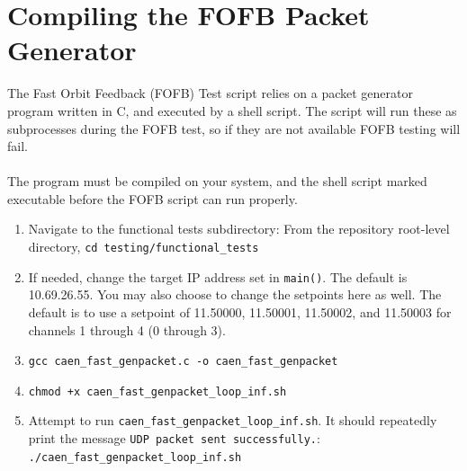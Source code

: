 \section{Compiling the FOFB Packet Generator}
The Fast Orbit Feedback (FOFB) Test script relies on a packet generator program written in C, and executed by a shell script. The script will run these as subprocesses during the FOFB test, so if they are not available FOFB testing will fail.\\\\The program must be compiled on your system, and the shell script marked executable before the FOFB script can run properly.\\
	\begin{enumerate}
		\item Navigate to the functional tests subdirectory: From the repository root-level directory, \texttt{cd testing/functional\_tests}
		\item If needed, change the target IP address set in \texttt{main()}. The default is 10.69.26.55. You may also choose to change the setpoints here as well. The default is to use a setpoint of 11.50000, 11.50001, 11.50002, and 11.50003 for channels 1 through 4 (0 through 3).
		\item \texttt{gcc caen\_fast\_genpacket.c -o caen\_fast\_genpacket}
		\item \texttt{chmod +x caen\_fast\_genpacket\_loop\_inf.sh}
		\item Attempt to run \texttt{caen\_fast\_genpacket\_loop\_inf.sh}. It should repeatedly print the message \texttt{UDP packet sent successfully.}: \texttt{./caen\_fast\_genpacket\_loop\_inf.sh}
	\end{enumerate}
	
